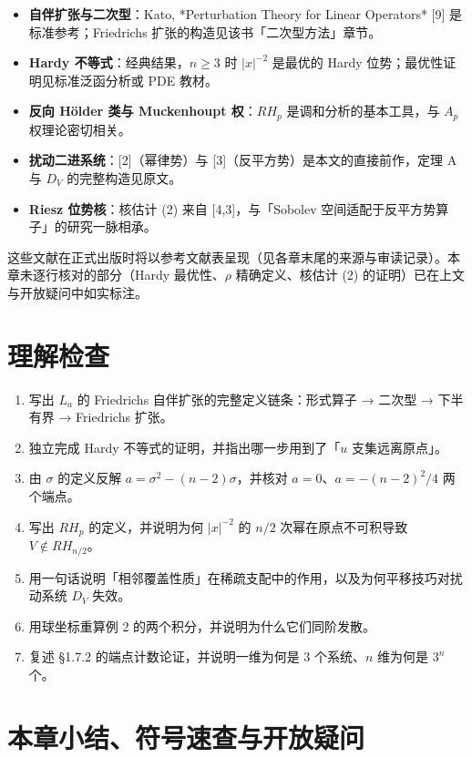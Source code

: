 \documentclass[a4paper,11pt,openany]{ctexbook}
\numberwithin{equation}{chapter}
\numberwithin{figure}{chapter}
\numberwithin{table}{chapter}
\begin{document}
\begin{itemize}
\item \textbf{自伴扩张与二次型}：Kato, *Perturbation Theory for Linear Operators* [9] 是标准参考；Friedrichs 扩张的构造见该书「二次型方法」章节。
\item \textbf{Hardy 不等式}：经典结果，$n\ge3$ 时 $|x|^{-2}$ 是最优的 Hardy 位势；最优性证明见标准泛函分析或 PDE 教材。
\item \textbf{反向 Hölder 类与 Muckenhoupt 权}：$RH_p$ 是调和分析的基本工具，与 $A_p$ 权理论密切相关。
\item \textbf{扰动二进系统}：[2]（幂律势）与 [3]（反平方势）是本文的直接前作，定理 A 与 $D_V$ 的完整构造见原文。
\item \textbf{Riesz 位势核}：核估计 (2) 来自 [4,3]，与「Sobolev 空间适配于反平方势算子」的研究一脉相承。
\end{itemize}

这些文献在正式出版时将以参考文献表呈现（见各章末尾的来源与审读记录）。本章未逐行核对的部分（Hardy 最优性、$\rho$ 精确定义、核估计 (2) 的证明）已在上文与开放疑问中如实标注。
\section{理解检查}

\begin{enumerate}
\item 写出 $L_a$ 的 Friedrichs 自伴扩张的完整定义链条：形式算子 → 二次型 → 下半有界 → Friedrichs 扩张。
\item 独立完成 Hardy 不等式的证明，并指出哪一步用到了「$u$ 支集远离原点」。
\item 由 $\sigma$ 的定义反解 $a=\sigma^2-(n-2)\sigma$，并核对 $a=0$、$a=-(n-2)^2/4$ 两个端点。
\item 写出 $RH_p$ 的定义，并说明为何 $|x|^{-2}$ 的 $n/2$ 次幂在原点不可积导致 $V\notin RH_{n/2}$。
\item 用一句话说明「相邻覆盖性质」在稀疏支配中的作用，以及为何平移技巧对扰动系统 $D_V$ 失效。
\item 用球坐标重算例 2 的两个积分，并说明为什么它们同阶发散。
\item 复述 §1.7.2 的端点计数论证，并说明一维为何是 $3$ 个系统、$n$ 维为何是 $3^n$ 个。
\end{enumerate}

\section{本章小结、符号速查与开放疑问}
\end{document}
